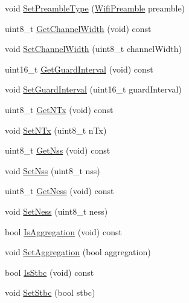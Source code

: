 \begin{DoxyCompactItemize}
\item 
void \hyperlink{classns3_1_1WifiTxVector_afa5117513e1a7bfa717c3d7556192525}{Set\+Preamble\+Type} (\hyperlink{group__wifi_ga5e94a56cb338a14ffbbb19c6a41251eb}{Wifi\+Preamble} preamble)
\item 
uint8\+\_\+t \hyperlink{classns3_1_1WifiTxVector_a1f8bfa51778a3e217581eb665f059564}{Get\+Channel\+Width} (void) const 
\item 
void \hyperlink{classns3_1_1WifiTxVector_a0af265bb9df36ba4012847160a23741d}{Set\+Channel\+Width} (uint8\+\_\+t channel\+Width)
\item 
uint16\+\_\+t \hyperlink{classns3_1_1WifiTxVector_ab80c0fd812542ef337a6cace4f64db63}{Get\+Guard\+Interval} (void) const 
\item 
void \hyperlink{classns3_1_1WifiTxVector_a40280b31baf8d7cef1a7234715969d06}{Set\+Guard\+Interval} (uint16\+\_\+t guard\+Interval)
\item 
uint8\+\_\+t \hyperlink{classns3_1_1WifiTxVector_a07b2c7289b69f1f4fd9776a0a9706e62}{Get\+N\+Tx} (void) const 
\item 
void \hyperlink{classns3_1_1WifiTxVector_ac04f0841322dd6122c5adf830fb662bf}{Set\+N\+Tx} (uint8\+\_\+t n\+Tx)
\item 
uint8\+\_\+t \hyperlink{classns3_1_1WifiTxVector_aa710c8455a710574b0c297d9ffdee004}{Get\+Nss} (void) const 
\item 
void \hyperlink{classns3_1_1WifiTxVector_af6b333491a8b20c064d8d1ad35381194}{Set\+Nss} (uint8\+\_\+t nss)
\item 
uint8\+\_\+t \hyperlink{classns3_1_1WifiTxVector_ab5a816f61d69f179243e96ca70f27191}{Get\+Ness} (void) const 
\item 
void \hyperlink{classns3_1_1WifiTxVector_a0402388fb5dc590075a4560daf294bf3}{Set\+Ness} (uint8\+\_\+t ness)
\item 
bool \hyperlink{classns3_1_1WifiTxVector_ad794f2bcb422440f0112c1d9a987bb95}{Is\+Aggregation} (void) const 
\item 
void \hyperlink{classns3_1_1WifiTxVector_a6f11a0d5373b041c7041986a2ed3ce10}{Set\+Aggregation} (bool aggregation)
\item 
bool \hyperlink{classns3_1_1WifiTxVector_a08850c40d63060668f758b802af7e7a3}{Is\+Stbc} (void) const 
\item 
void \hyperlink{classns3_1_1WifiTxVector_a03db79f733c3f5d36c1816f43eebe62a}{Set\+Stbc} (bool stbc)
\end{DoxyCompactItemize}
